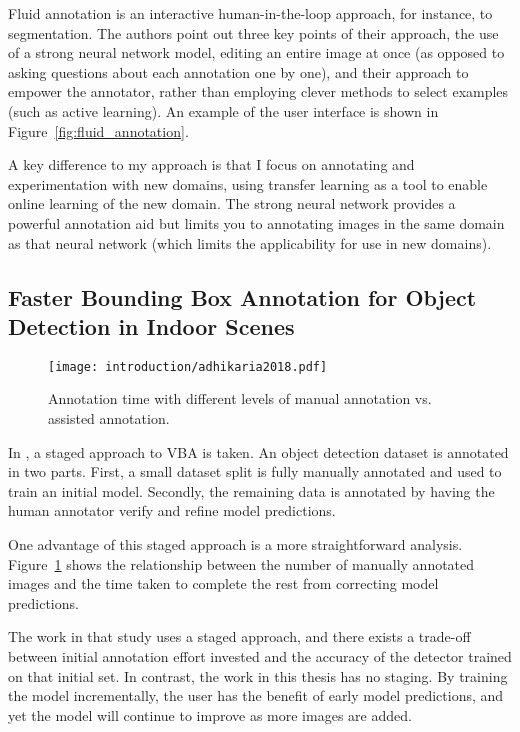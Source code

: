 Fluid annotation \cite{Andriluka2018} is an interactive human-in-the-loop approach, for instance, to segmentation. The authors point out three key points of their approach, the use of a strong neural network model, editing an entire image at once (as opposed to asking questions about each annotation one by one), and their approach to empower the annotator, rather than employing clever methods to select examples (such as active learning). An example of the user interface is shown in Figure~\ref{fig:fluid_annotation}.

A key difference to my approach is that I focus on annotating and experimentation with new domains, using transfer learning as a tool to enable online learning of the new domain. The strong neural network provides a powerful annotation aid but limits you to annotating images in the same domain as that neural network (which limits the applicability for use in new domains).

\subsection{Faster Bounding Box Annotation for Object Detection in Indoor Scenes  \texorpdfstring{\cite{Adhikaria2018}}{}}

\begin{figure}[h]
  \centering
  \texttt{[image: introduction/adhikaria2018.pdf]}
  \caption{Annotation time with different levels of manual annotation vs. assisted annotation. \cite{Adhikaria2018}}  
  \label{fig:adhikaria2018}
\end{figure}

In \cite{Adhikaria2018}, a staged approach to \gls{VBA} is taken. An object detection dataset is annotated in two parts. First, a small dataset split is fully manually annotated and used to train an initial model. Secondly, the remaining data is annotated by having the human annotator verify and refine model predictions. 

One advantage of this staged approach is a more straightforward analysis. Figure~\ref{fig:adhikaria2018} shows the relationship between the number of manually annotated images and the time taken to complete the rest from correcting model predictions.

The work in that study uses a staged approach, and there exists a trade-off between initial annotation effort invested and the accuracy of the detector trained on that initial set. In contrast, the work in this thesis has no staging. By training the model incrementally, the user has the benefit of early model predictions, and yet the model will continue to improve as more images are added.

